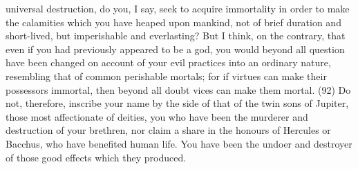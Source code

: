 universal destruction, do you, I say, seek to acquire immortality in order to make the calamities
which you have heaped upon mankind, not of brief duration and short-lived, but imperishable and
everlasting? But I think, on the contrary, that even if you had previously appeared to be a god, you
would beyond all question have been changed on account of your evil practices into an ordinary
nature, resembling that of common perishable mortals; for if virtues can make their possessors
immortal, then beyond all doubt vices can make them mortal. (92) Do not, therefore, inscribe your
name by the side of that of the twin sons of Jupiter, those most affectionate of deities, you who
have been the murderer and destruction of your brethren, nor claim a share in the honours of
Hercules or Bacchus, who have benefited human life. You have been the undoer and destroyer of
those good effects which they produced.

